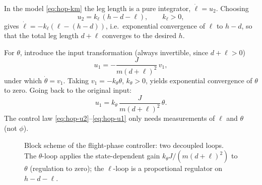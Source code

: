 \documentclass[11pt,a4paper]{article}
\theoremstyle{definition}
\theoremstyle{plain}
\theoremstyle{remark}
\begin{document}
In the model \eqref{eq:hop-km} the leg length is a pure integrator, $\dot\ell=u_2$. Choosing
\begin{equation}
  u_2=k_\ell\,(h-d-\ell),\qquad k_\ell>0,
  \label{eq:hop-u2}
\end{equation}
gives $\dot\ell=-k_\ell(\ell-(h-d))$, i.e.\ exponential convergence of $\ell$ to $h-d$, so that the total leg length $d+\ell$ converges to the desired $h$.

For $\theta$, introduce the input transformation (always invertible, since $d+\ell>0$)
\[
  u_1=-\frac{J}{m(d+\ell)^2}\,v_1 ,
\]
under which $\dot\theta=v_1$. Taking $v_1=-k_\theta\theta$, $k_\theta>0$, yields exponential convergence of $\theta$ to zero. Going back to the original input:
\begin{equation}
  u_1=k_\theta\,\frac{J}{m(d+\ell)^2}\,\theta .
  \label{eq:hop-u1}
\end{equation}
The control law \eqref{eq:hop-u2}--\eqref{eq:hop-u1} only needs measurements of $\ell$ and $\theta$ (not $\phi$).

\begin{figure}[H]
\centering
{}
\caption{Block scheme of the flight-phase controller: two decoupled loops. The $\theta$-loop applies the state-dependent gain $k_\theta J/(m(d+\ell)^2)$ to $\theta$ (regulation to zero); the $\ell$-loop is a proportional regulator on $h-d-\ell$.}
\end{figure}
\end{document}
